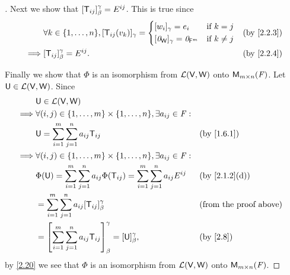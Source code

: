 \begin{proof}[]
	Next we show that \([\mathsf{T}_{i j}]_{\beta}^{\gamma} = E^{i j}\).
	This is true since
	\begin{align*}
		         & \forall k \in \set{1, \dots, n}, [\T_{i j}(v_k)]_{\gamma} = \begin{dcases}
			                                                                       [w_i]_{\gamma} = e_i                 & \text{if } k = j    \\
			                                                                       [\zv_{\W}]_{\gamma} = \zv_{\vs{F}^m} & \text{if } k \neq j
		                                                                       \end{dcases} &  & \by{2.2.3} \\
		\implies & [\T_{i j}]_{\beta}^{\gamma} = E^{i j}.                                       &  & \by{2.2.4}
	\end{align*}

	Finally we show that \(\Phi\) is an isomorphism from \(\mathcal{L}(\mathsf{V}, \mathsf{W})\) onto \(\MS\).
	Let \(\mathsf{U} \in \mathcal{L}(\mathsf{V}, \mathsf{W})\).
	Since
	\begin{align*}
		         & \U \in \ls(\V, \W)                                                                                                                                 \\
		\implies & \forall (i, j) \in \set{1, \dots, m} \times \set{1, \dots, n}, \exists a_{i j} \in \F :                                                            \\
		         & \U = \sum_{i = 1}^m \sum_{j = 1}^n a_{i j} \T_{i j}                                                             &  & \by{1.6.1}                    \\
		\implies & \forall (i, j) \in \set{1, \dots, m} \times \set{1, \dots, n}, \exists a_{i j} \in \F :                                                            \\
		         & \Phi(\U) = \sum_{i = 1}^m \sum_{j = 1}^n a_{i j} \Phi(\T_{i j}) = \sum_{i = 1}^m \sum_{j = 1}^n a_{i j} E^{i j} &  & \by{2.1.2}[d]                 \\
		         & = \sum_{i = 1}^m \sum_{j = 1}^n a_{i j} [\T_{i j}]_{\beta}^{\gamma}                                             &  & \text{(from the proof above)} \\
		         & = \br{\sum_{i = 1}^m \sum_{j = 1}^n a_{i j} \T_{i j}}_{\beta}^{\gamma} = [\U]_{\beta}^{\gamma},                 &  & \by{2.8}
	\end{align*}
	by \cref{2.20} we see that \(\Phi\) is an isomorphism from \(\mathcal{L}(\mathsf{V}, \mathsf{W})\) onto \(\MS\).
\end{proof}

